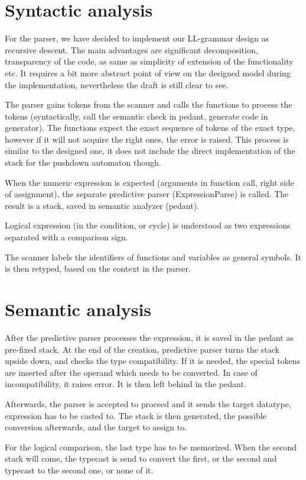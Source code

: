 \documentclass[10pt,a4paper,titlepage]{article}
\begin{document}
\section{Syntactic analysis}
\begin{justify}
For the parser, we have decided to implement our LL-grammar design as
recursive descent. The main advantages are significant decomposition,
transparency of the code, as same as simplicity of extension of the
functionality etc. It requires a bit more abstract point of view on the
designed model during the implementation, nevertheless the draft is still
clear to see.

The parser gains tokens from the scanner and calls the functions to process
the tokens (syntactically, call the semantic check in pedant, generate code
in generator). The functions expect the exact sequence of tokens of the exact
type, however if it will not acquire the right ones, the error is raised. This
process is similar to the designed one, it does not include the direct
implementation of the stack for the pushdown automaton though.
\end{justify}

\newpage
\begin{justify}
When the numeric expression is expected (arguments in function call, right
side of assignment), the separate predictive parser (ExpressionParse) is
called. The result is a stack, saved in semantic analyzer (pedant).

Logical expression (in the condition, or cycle) is understood as two
expressions separated with a comparison sign.

The scanner labels the identifiers of functions and variables as general
symbols. It is then retyped, based on the context in the parser.
\end{justify}

\section{Semantic analysis}
\begin{justify}
After the predictive parser processes the expression, it is saved in the
pedant as pre-fixed stack. At the end of the creation, predictive parser turns
the stack upside down, and checks the type compatibility. If it is needed,
the special tokens are inserted after the operand which needs to be converted.
In case of incompatibility, it raises error. It is then left behind in the
pedant.

Afterwards, the parser is accepted to proceed and it sends the target datatype,
expression has to be casted to. The stack is then generated, the possible
conversion afterwards, and the target to assign to.

For the logical comparison, the last type has to be memorized. When the
second stack will come, the typecast is send to convert the first, or the
second and typecast to the second one, or none of it.
\end{justify}
\end{document}
